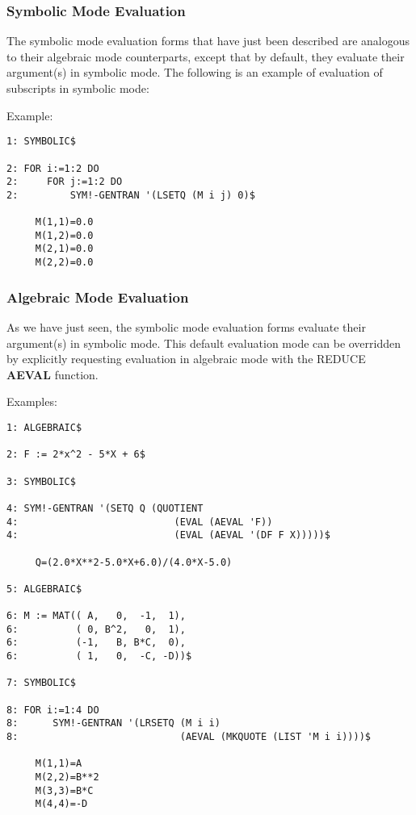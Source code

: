 \subsubsection{Symbolic Mode Evaluation}
\label{lispeval}
The symbolic mode evaluation forms that have just been described are
analogous to their algebraic mode counterparts, except that
by default, they evaluate their argument(s) in symbolic mode.  The
following is an example of evaluation of subscripts in symbolic mode:
\begin{describe}{Example:}
\begin{verbatim}
1: SYMBOLIC$

2: FOR i:=1:2 DO 
2:     FOR j:=1:2 DO 
2:         SYM!-GENTRAN '(LSETQ (M i j) 0)$

     M(1,1)=0.0
     M(1,2)=0.0
     M(2,1)=0.0
     M(2,2)=0.0
\end{verbatim}
\end{describe} 

\subsubsection{Algebraic Mode Evaluation}
As we have just seen, the symbolic mode evaluation forms evaluate their
argument(s) in symbolic mode.  This default evaluation mode can be
overridden by explicitly requesting evaluation in algebraic mode with
the REDUCE {\bf AEVAL} function.

\begin{describe}{Examples:}
\begin{verbatim}
1: ALGEBRAIC$

2: F := 2*x^2 - 5*X + 6$ 

3: SYMBOLIC$ 

4: SYM!-GENTRAN '(SETQ Q (QUOTIENT 
4:                           (EVAL (AEVAL 'F)) 
4:                           (EVAL (AEVAL '(DF F X)))))$

     Q=(2.0*X**2-5.0*X+6.0)/(4.0*X-5.0)

5: ALGEBRAIC$ 

6: M := MAT(( A,   0,  -1,  1), 
6:          ( 0, B^2,   0,  1), 
6:          (-1,   B, B*C,  0), 
6:          ( 1,   0,  -C, -D))$ 

7: SYMBOLIC$ 

8: FOR i:=1:4 DO 
8:      SYM!-GENTRAN '(LRSETQ (M i i) 
8:                            (AEVAL (MKQUOTE (LIST 'M i i))))$

     M(1,1)=A
     M(2,2)=B**2
     M(3,3)=B*C
     M(4,4)=-D
\end{verbatim}
\end{describe}

